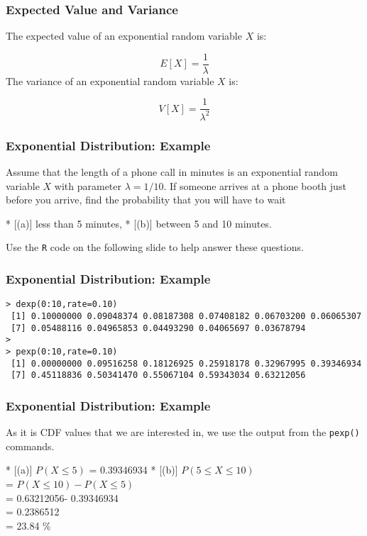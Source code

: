 \begin{frame}[fragile]
\frametitle{Expected Value and Variance}
The expected value of an exponential random variable $X$ is:

\[
E[X] = \frac{1}{\lambda}\]
The variance of an exponential random variable $X$ is:

\[
V[X] = \frac{1}{\lambda^2}\]

\end{frame}

\begin{frame}[fragile]
\frametitle{Exponential Distribution: Example}
Assume that the length of a phone call in minutes is an exponential random variable $X$ with parameter
$\lambda = 1/10$. If someone arrives at a phone booth just before you arrive, find the probability that you
will have to wait \begin{itemize}
* [(a)] less than 5 minutes,  
* [(b)] between 5 and 10 minutes.
\end{itemize}
Use the \texttt{R} code on the following slide to help answer these questions.
\end{frame}



\begin{frame}[fragile]
\frametitle{Exponential Distribution: Example}
\begin{verbatim}
> dexp(0:10,rate=0.10)
 [1] 0.10000000 0.09048374 0.08187308 0.07408182 0.06703200 0.06065307
 [7] 0.05488116 0.04965853 0.04493290 0.04065697 0.03678794
>
> pexp(0:10,rate=0.10)
 [1] 0.00000000 0.09516258 0.18126925 0.25918178 0.32967995 0.39346934
 [7] 0.45118836 0.50341470 0.55067104 0.59343034 0.63212056
\end{verbatim}
\end{frame}

\begin{frame}[fragile]
\frametitle{Exponential Distribution: Example}

As it is CDF values that we are interested in, we use the output from the \texttt{pexp()} commands.

\begin{itemize}
* [(a)] $P(X \leq 5)$ = 0.39346934 
* [(b)] $P(5 \leq X \leq 10)$ \\ = $P( X \leq 10) - P( X \leq 5)$ \\ = 0.63212056- 0.39346934 \\ = 0.2386512 \\= 23.84 $\%$
\end{itemize}

\end{frame}



